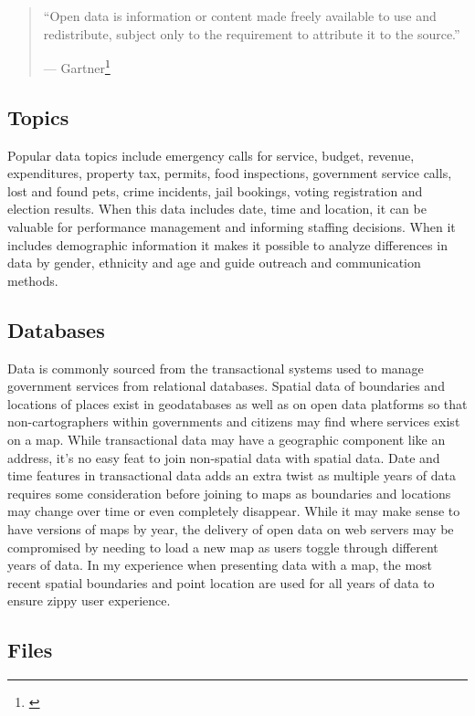 \documentclass[
  openany]{book}
\begin{document}
\begin{quote}
``Open data is information or content made freely available to use and redistribute, subject only to the requirement to attribute it to the source.''

--- Gartner\footnote{\citet{gartner_opendata}}
\end{quote}

\hypertarget{topics}{%
\subsection{Topics}\label{topics}}

Popular data topics include emergency calls for service, budget, revenue, expenditures, property tax, permits, food inspections, government service calls, lost and found pets, crime incidents, jail bookings, voting registration and election results. When this data includes date, time and location, it can be valuable for performance management and informing staffing decisions. When it includes demographic information it makes it possible to analyze differences in data by gender, ethnicity and age and guide outreach and communication methods.

\hypertarget{databases}{%
\subsection{Databases}\label{databases}}

Data is commonly sourced from the transactional systems used to manage government services from relational databases.
Spatial data of boundaries and locations of places exist in geodatabases as well as on open data platforms so that non-cartographers within governments and citizens may find where services exist on a map. While transactional data may have a geographic component like an address, it's no easy feat to join non-spatial data with spatial data. Date and time features in transactional data adds an extra twist as multiple years of data requires some consideration before joining to maps as boundaries and locations may change over time or even completely disappear. While it may make sense to have versions of maps by year, the delivery of open data on web servers may be compromised by needing to load a new map as users toggle through different years of data. In my experience when presenting data with a map, the most recent spatial boundaries and point location are used for all years of data to ensure zippy user experience.

\hypertarget{files}{%
\subsection{Files}\label{files}}
\end{document}

